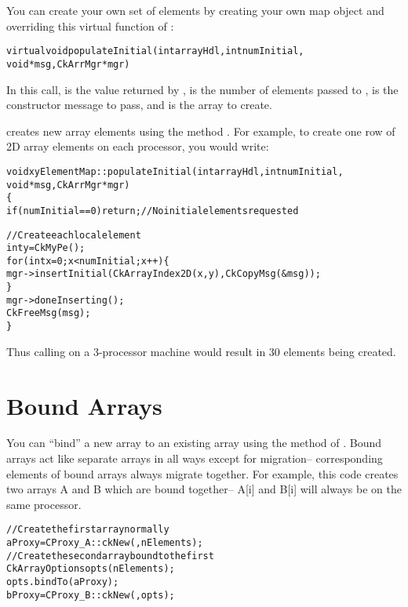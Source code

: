 You can create your own set of elements by creating your
own map object and overriding this virtual function of :

\begin{alltt}
  virtual void populateInitial(int arrayHdl,int numInitial,
	void *msg,CkArrMgr *mgr)
\end{alltt}

In this call,  is the value returned by ,
 is the number of elements passed to ,
 is the constructor message to pass, and  is the
array to create.

 creates new array elements using the method
.
For example, to create one row of 2D array elements on each processor,
you would write:

\begin{alltt}
void xyElementMap::populateInitial(int arrayHdl,int numInitial,
	void *msg,CkArrMgr *mgr)
\{
  if (numInitial==0) return; //No initial elements requested
	
  //Create each local element
  int y=CkMyPe();
  for (int x=0;x<numInitial;x++) \{
    mgr->insertInitial(CkArrayIndex2D(x,y),CkCopyMsg(&msg));
  \}
  mgr->doneInserting();
  CkFreeMsg(msg);
\}
\end{alltt}

Thus calling  on a 3-processor machine would result in
30 elements being created.


\section{Bound Arrays}
 
\label{bound arrays}

You can ``bind'' a new array to an existing array
using the  method of .  Bound arrays
act like separate arrays in all ways except for migration--
corresponding elements of bound arrays always migrate together.
For example, this code creates two arrays A and B which are
bound together-- A[i] and B[i] will always be on the same processor.

\begin{alltt}
//Create the first array normally
  aProxy=CProxy_A::ckNew(,nElements);
//Create the second array bound to the first
  CkArrayOptions opts(nElements);
  opts.bindTo(aProxy);
  bProxy=CProxy_B::ckNew(,opts);
\end{alltt}

